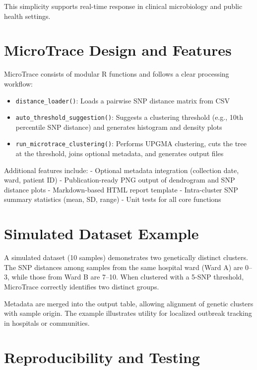 \documentclass[
]{article}
\providecommand{\tightlist}{%
  \setlength{\itemsep}{0pt}\setlength{\parskip}{0pt}}
\begin{document}
This simplicity supports real-time response in clinical microbiology and
public health settings.

\section{MicroTrace Design and
Features}\label{microtrace-design-and-features}

MicroTrace consists of modular R functions and follows a clear
processing workflow:

\begin{itemize}
\tightlist
\item
  \texttt{distance\_loader()}: Loads a pairwise SNP distance matrix from
  CSV
\item
  \texttt{auto\_threshold\_suggestion()}: Suggests a clustering
  threshold (e.g., 10th percentile SNP distance) and generates histogram
  and density plots
\item
  \texttt{run\_microtrace\_clustering()}: Performs UPGMA clustering,
  cuts the tree at the threshold, joins optional metadata, and generates
  output files
\end{itemize}

Additional features include: - Optional metadata integration (collection
date, ward, patient ID) - Publication-ready PNG output of dendrogram and
SNP distance plots - Markdown-based HTML report template - Intra-cluster
SNP summary statistics (mean, SD, range) - Unit tests for all core
functions

\section{Simulated Dataset Example}\label{simulated-dataset-example}

A simulated dataset (10 samples) demonstrates two genetically distinct
clusters. The SNP distances among samples from the same hospital ward
(Ward A) are 0--3, while those from Ward B are 7--10. When clustered
with a 5-SNP threshold, MicroTrace correctly identifies two distinct
groups.

Metadata are merged into the output table, allowing alignment of genetic
clusters with sample origin. The example illustrates utility for
localized outbreak tracking in hospitals or communities.

\section{Reproducibility and Testing}\label{reproducibility-and-testing}
\end{document}
